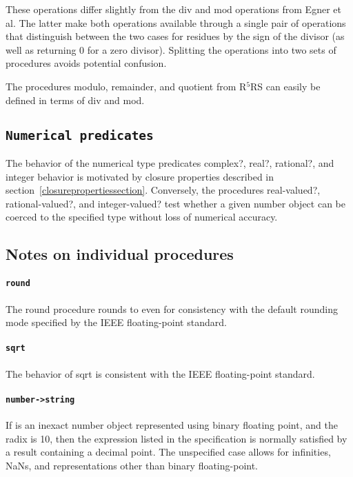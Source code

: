 \documentclass[twoside,twocolumn]{algol60}
\newcommand{\rn}[1]{R$^{#1}$RS}
\begin{document}
These operations differ slightly from the $\mathrm{div}$ and
$\mathrm{mod}$ operations from Egner et al.  The latter make both operations
available through a single pair of operations that distinguish
between the two cases for residues by the sign of the divisor (as well
as returning $0$ for a zero divisor).  Splitting the operations into
two sets of procedures avoids potential confusion.

The procedures {\cf modulo}, {\cf remainder}, and {\cf quotient} from
\rn{5} can easily be defined in terms of {\cf div} and {\cf mod}.

\subsection{{\tt Numerical predicates}}

The behavior of the numerical type predicates {\cf complex?}, {\cf
  real?}, {\cf rational?}, and {\cf integer} behavior is motivated by
closure properties described in
section~\ref{closurepropertiessection}.  Conversely, the procedures
{\cf real-valued?}, {\cf rational-valued?}, and {\cf integer-valued?}
test whether a given number object can be coerced to the specified type
without loss of numerical accuracy.

\subsection{Notes on individual procedures}

\paragraph{{\tt round}}

The {\cf round} procedure rounds to even for consistency with the
default rounding mode specified by the IEEE floating-point standard.

\paragraph{{\tt sqrt}}

The behavior of {\cf sqrt} is consistent with the IEEE floating-point
standard.

\paragraph{{\tt number->string}}

If  is an inexact number object represented using binary floating
point, and the radix is 10, then the expression listed in the
specification is normally satisfied by a result containing a decimal
point.  The unspecified case allows for infinities, NaNs, and
representations other than binary floating-point.
\end{document}
